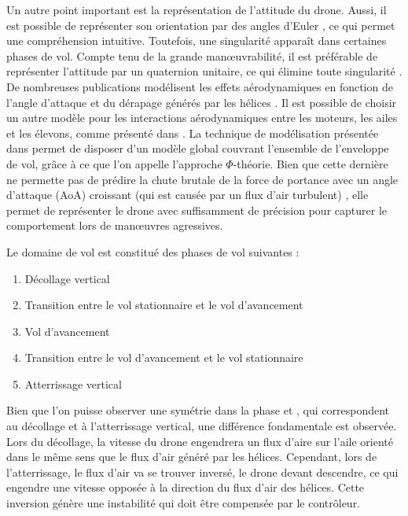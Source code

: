 Un autre point important est la représentation de l'attitude du drone. Aussi, il est possible de représenter son orientation par des angles d'Euler \cite{4177650, 5415267, 8003165}, ce qui permet une compréhension intuitive. Toutefois, une singularité apparaît dans certaines phases de vol. Compte tenu de la grande manœuvrabilité, il est préférable de représenter l'attitude par un quaternion unitaire, ce qui élimine toute singularité \cite{8027691}. De nombreuses publications modélisent les effets aérodynamiques en fonction de l'angle d'attaque et du dérapage générés par les hélices \cite{Escareno07, 8453301}. 
Il est possible de choisir un autre modèle pour les interactions aérodynamiques entre les moteurs, les ailes et les élevons, comme présenté dans \cite{lustosaHal-03035938}. La technique de modélisation présentée dans \cite{lustosaHal-03035938} permet de disposer d'un modèle global couvrant l'ensemble de l'enveloppe de vol, grâce à ce que l'on appelle l'approche $\Phi$-théorie. Bien que cette dernière ne permette pas de prédire la chute brutale de la force de portance avec un angle d'attaque (AoA) croissant (qui est causée par un flux d'air turbulent) \cite{tal2022global}, elle permet de représenter le drone avec suffisamment de précision pour capturer le comportement lors de manœuvres agressives. 

\noindent
Le domaine de vol est constitué des phases de vol suivantes :
\begin{enumerate}
    \item Décollage vertical
    \item Transition entre le vol stationnaire et le vol d'avancement
    \item Vol d'avancement
    \item Transition entre le vol d'avancement et le vol stationnaire
    \item Atterrissage vertical
\end{enumerate}
Bien que l'on puisse observer une symétrie dans la phase  et , qui correspondent au décollage et à l'atterrissage vertical, une différence fondamentale est observée. Lors du décollage, la vitesse du drone engendrera un flux d'aire sur l'aile orienté dans le même sens que le flux d'air généré par les hélices. Cependant, lors de l'atterrissage, le flux d'air va se trouver inversé, le drone devant descendre, ce qui engendre une vitesse opposée à la direction du flux d'air des hélices. Cette inversion génère une instabilité qui doit être compensée par le contrôleur.

